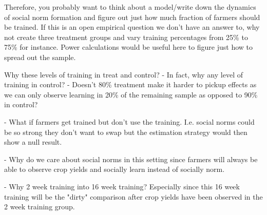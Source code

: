 \documentclass{article}
\begin{document}
Therefore, you probably want to think about a model/write down the dynamics of
social norm formation and figure out just how much fraction of farmers should 
be trained. If this is an open empirical question we don't have an answer to, 
why not create three treatment groups and vary training percentages from 25\% to 
75\% for instance. Power calculations would be useful here to figure just how 
to spread out the sample.



Why these levels of training in treat and control? 
- In fact, why any level of training in control?
- Doesn't 80\% treatment make it harder to pickup effects as we can only 
observe learning in 20\% of the remaining sample as opposed to 90\% in control?



- What if farmers get trained but don't use the training. I.e. social norms 
could be so strong they don't want to swap but the estimation strategy would then 
show a null result.

- Why do we care about social norms in this setting since farmers will always be 
able to observe crop yields and socially learn instead of socially norm. 





- Why 2 week training into 16 week training? Especially since this 16 week 
training will be the "dirty" comparison after crop yields have been observed in 
the 2 week training group.
    
\end{document}
